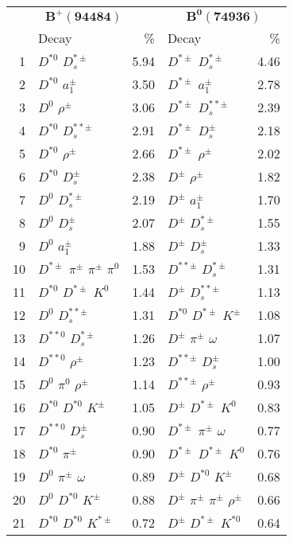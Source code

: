 \documentclass[6pt]{article}
\begin{document}
\begin{tabular}{rlr|lr}
\multicolumn{3}{c|}{$\boldsymbol{B^+(94484)}$} & \multicolumn{2}{c}{$\boldsymbol{B^0(74936)}$} \\
& Decay & \% & Decay & \% \\ \hline \hline
1 & $D^{*0}$ $D_s^{*\pm}$ & 5.94 & $D^{*\pm}$ $D_s^{*\pm}$ & 4.46 \\
2 & $D^{*0}$ $a_1^{\pm}$ & 3.50 & $D^{*\pm}$ $a_1^{\pm}$ & 2.78 \\
3 & $D^0$ $\rho^{\pm}$ & 3.06 & $D^{*\pm}$ $D_s^{**\pm}$ & 2.39 \\
4 & $D^{*0}$ $D_s^{**\pm}$ & 2.91 & $D^{*\pm}$ $D_s^{\pm}$ & 2.18 \\
5 & $D^{*0}$ $\rho^{\pm}$ & 2.66 & $D^{*\pm}$ $\rho^{\pm}$ & 2.02 \\
6 & $D^{*0}$ $D_s^{\pm}$ & 2.38 & $D^{\pm}$ $\rho^{\pm}$ & 1.82 \\
7 & $D^0$ $D_s^{*\pm}$ & 2.19 & $D^{\pm}$ $a_1^{\pm}$ & 1.70 \\
8 & $D^0$ $D_s^{\pm}$ & 2.07 & $D^{\pm}$ $D_s^{*\pm}$ & 1.55 \\
9 & $D^0$ $a_1^{\pm}$ & 1.88 & $D^{\pm}$ $D_s^{\pm}$ & 1.33 \\
10 & $D^{*\pm}$ $\pi^{\pm}$ $\pi^{\pm}$ $\pi^0$ & 1.53 & $D^{**\pm}$ $D_s^{*\pm}$ & 1.31 \\
11 & $D^{*0}$ $D^{*\pm}$ $K^0$ & 1.44 & $D^{\pm}$ $D_s^{**\pm}$ & 1.13 \\
12 & $D^0$ $D_s^{**\pm}$ & 1.31 & $D^{*0}$ $D^{*\pm}$ $K^{\pm}$ & 1.08 \\
13 & $D^{**0}$ $D_s^{*\pm}$ & 1.26 & $D^{\pm}$ $\pi^{\pm}$ $\omega$ & 1.07 \\
14 & $D^{**0}$ $\rho^{\pm}$ & 1.23 & $D^{**\pm}$ $D_s^{\pm}$ & 1.00 \\
15 & $D^0$ $\pi^0$ $\rho^{\pm}$ & 1.14 & $D^{**\pm}$ $\rho^{\pm}$ & 0.93 \\
16 & $D^{*0}$ $D^{*0}$ $K^{\pm}$ & 1.05 & $D^{\pm}$ $D^{*\pm}$ $K^0$ & 0.83 \\
17 & $D^{**0}$ $D_s^{\pm}$ & 0.90 & $D^{*\pm}$ $\pi^{\pm}$ $\omega$ & 0.77 \\
18 & $D^{*0}$ $\pi^{\pm}$ & 0.90 & $D^{*\pm}$ $D^{*\pm}$ $K^0$ & 0.76 \\
19 & $D^0$ $\pi^{\pm}$ $\omega$ & 0.89 & $D^{\pm}$ $D^{*0}$ $K^{\pm}$ & 0.68 \\
20 & $D^0$ $D^{*0}$ $K^{\pm}$ & 0.88 & $D^{\pm}$ $\pi^{\pm}$ $\pi^{\pm}$ $\rho^{\pm}$ & 0.66 \\
21 & $D^{*0}$ $D^{*0}$ $K^{*\pm}$ & 0.72 & $D^{\pm}$ $D^{*\pm}$ $K^{*0}$ & 0.64 \\

\end{tabular}
\end{document}
